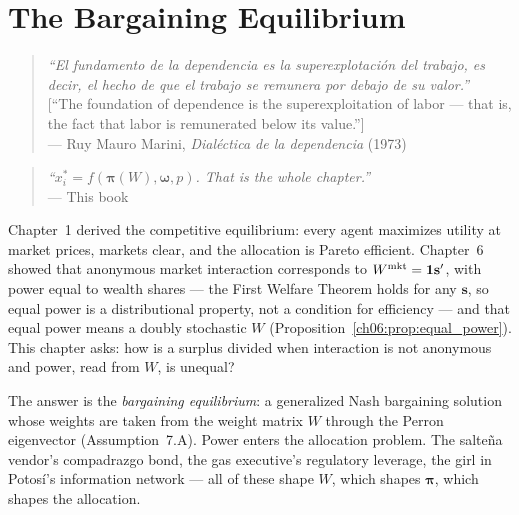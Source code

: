 \documentclass[../structural_economics_book.tex]{subfiles}
\begin{document}
\ifSubfilesClassLoaded{\setcounter{chapter}{6}}{}
\chapter{The Bargaining Equilibrium}\label{ch:07}
\begin{quote}
\textit{``El fundamento de la dependencia es la superexplotaci\'{o}n del trabajo, es decir, el hecho de que el trabajo se remunera por debajo de su valor.''}\\[0.3em]
\textnormal{[``The foundation of dependence is the superexploitation of labor --- that is, the fact that labor is remunerated below its value.'']}\\
\hfill --- Ruy Mauro Marini, \textit{Dial\'{e}ctica de la dependencia} (1973)
\end{quote}
\nocite{marini1973dialectica}

\vspace{0.5em}

\begin{quote}
\textit{``$x_i^* = f(\boldsymbol{\pi}(W), \boldsymbol{\omega}, p)$. That is the whole chapter.''}\\
\hfill --- This book
\end{quote}

\vspace{1em}

Chapter~1 derived the competitive equilibrium: every agent maximizes utility at market prices, markets clear, and the allocation is Pareto efficient. Chapter~6 showed that anonymous market interaction corresponds to $W^{\text{mkt}} = \mathbf{1}\mathbf{s}'$, with power equal to wealth shares --- the First Welfare Theorem holds for any $\mathbf{s}$, so equal power is a distributional property, not a condition for efficiency --- and that equal power means a doubly stochastic $W$ (Proposition~\ref{ch06:prop:equal_power}). This chapter asks: how is a surplus divided when interaction is not anonymous and power, read from $W$, is unequal?

The answer is the \textit{bargaining equilibrium}: a generalized Nash bargaining solution whose weights are taken from the weight matrix $W$ through the Perron eigenvector (Assumption~7.A). Power enters the allocation problem. The salte\~{n}a vendor's compadrazgo bond, the gas executive's regulatory leverage, the girl in Potos\'{i}'s information network --- all of these shape $W$, which shapes $\boldsymbol{\pi}$, which shapes the allocation.
\end{document}
